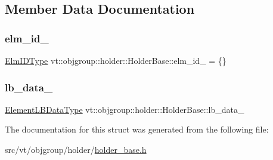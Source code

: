 \subsection{Member Data Documentation}
\mbox{\label{structvt_1_1objgroup_1_1holder_1_1_holder_base_a0302cbe111e4bfa8cc8cd1fc47b39b27}} 
\subsubsection{\texorpdfstring{elm\+\_\+id\+\_\+}{elm\_id\_}}
{\footnotesize\ttfamily \hyperlink{structvt_1_1objgroup_1_1holder_1_1_holder_base_a89c0ce1f23237ab00aee86d4d339bc50}{Elm\+I\+D\+Type} vt\+::objgroup\+::holder\+::\+Holder\+Base\+::elm\+\_\+id\+\_\+ = \{\}\hspace{0.3cm}{\ttfamily [protected]}}

\mbox{\label{structvt_1_1objgroup_1_1holder_1_1_holder_base_a387f07d8e738b627a97ace582aa51430}} 
\subsubsection{\texorpdfstring{lb\+\_\+data\+\_\+}{lb\_data\_}}
{\footnotesize\ttfamily \hyperlink{structvt_1_1objgroup_1_1holder_1_1_holder_base_a53deb78d918d7281cf01a0f09e410411}{Element\+L\+B\+Data\+Type} vt\+::objgroup\+::holder\+::\+Holder\+Base\+::lb\+\_\+data\+\_\+\hspace{0.3cm}{\ttfamily [protected]}}



The documentation for this struct was generated from the following file\+:\begin{DoxyCompactItemize}
\item 
src/vt/objgroup/holder/\hyperlink{holder__base_8h}{holder\+\_\+base.\+h}\end{DoxyCompactItemize}
